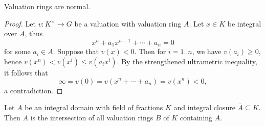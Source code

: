 \documentclass[10pt]{article}
\begin{document}
\begin{lemma}
Valuation rings are normal.
\end{lemma}
\begin{proof}
  Let $v : K^\times  \rightarrow G$ be a valuation
  with valuation ring $A$.
  Let $x \in K$ be integral over $A$,
  thus
  \[
    x^n + a_1 x^{n-1} + \dotsb + a_n = 0
  \]
  for some $a_i \in A$.
  Suppose that $v(x) < 0$.
  Then for $i=1..n$,
  we have $v(a_i) \geq 0$,
  hence $v(x^n) < v(x^{i}) \leq v(a_i x^i)$.
  By the strengthened ultrametric inequality,
  it follows that
  \[
    \infty = v(0) = v(x^n + \dotsb + a_n) = v(x^n) < 0,
  \]
  a contradiction.
\end{proof}

\begin{theorem}
  Let $A$ be an integral domain with field of fractions $K$
  and integral closure $\overline{A} \subseteq K$.
  Then $\overline{A}$ is the intersection of all valuation rings
  $B$ of $K$ containing $A$.
\end{theorem}
\end{document}
